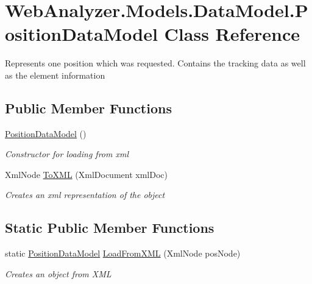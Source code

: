 \hypertarget{class_web_analyzer_1_1_models_1_1_data_model_1_1_position_data_model}{}\section{Web\+Analyzer.\+Models.\+Data\+Model.\+Position\+Data\+Model Class Reference}
\label{class_web_analyzer_1_1_models_1_1_data_model_1_1_position_data_model}


Represents one position which was requested. Contains the tracking data as well as the element information  


\subsection*{Public Member Functions}
\begin{DoxyCompactItemize}
\item 
\hyperlink{class_web_analyzer_1_1_models_1_1_data_model_1_1_position_data_model_ad8fdd7054415f4211babc9a8b838ed22}{Position\+Data\+Model} ()
\begin{DoxyCompactList}\small\item\em Constructor for loading from xml \end{DoxyCompactList}\item 
Xml\+Node \hyperlink{class_web_analyzer_1_1_models_1_1_data_model_1_1_position_data_model_a371659171eacec3ce6a1f641a11df165}{To\+X\+M\+L} (Xml\+Document xml\+Doc)
\begin{DoxyCompactList}\small\item\em Creates an xml representation of the object \end{DoxyCompactList}\end{DoxyCompactItemize}
\subsection*{Static Public Member Functions}
\begin{DoxyCompactItemize}
\item 
static \hyperlink{class_web_analyzer_1_1_models_1_1_data_model_1_1_position_data_model}{Position\+Data\+Model} \hyperlink{class_web_analyzer_1_1_models_1_1_data_model_1_1_position_data_model_a685b721ae7f666981d7da3e599641cb0}{Load\+From\+X\+M\+L} (Xml\+Node pos\+Node)
\begin{DoxyCompactList}\small\item\em Creates an object from X\+M\+L \end{DoxyCompactList}\end{DoxyCompactItemize}
